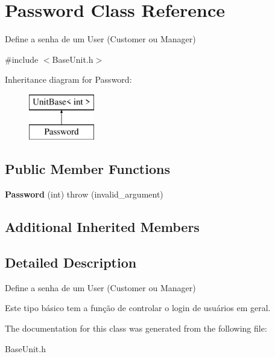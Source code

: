 \hypertarget{classPassword}{\section{Password Class Reference}
\label{classPassword}
}


Define a senha de um User (Customer ou Manager)  




{\ttfamily \#include $<$Base\-Unit.\-h$>$}

Inheritance diagram for Password\-:\begin{figure}[H]
\begin{center}
\leavevmode
\includegraphics[height=2.000000cm]{classPassword}
\end{center}
\end{figure}
\subsection*{Public Member Functions}
\begin{DoxyCompactItemize}
\item 
\hypertarget{classPassword_a3bd047af975e01295f877bf590007cab}{{\bfseries Password} (int)  throw (invalid\-\_\-argument)}\label{classPassword_a3bd047af975e01295f877bf590007cab}

\end{DoxyCompactItemize}
\subsection*{Additional Inherited Members}


\subsection{Detailed Description}
Define a senha de um User (Customer ou Manager) 

Este tipo básico tem a função de controlar o login de usuários em geral. 

The documentation for this class was generated from the following file\-:\begin{DoxyCompactItemize}
\item 
Base\-Unit.\-h\end{DoxyCompactItemize}
